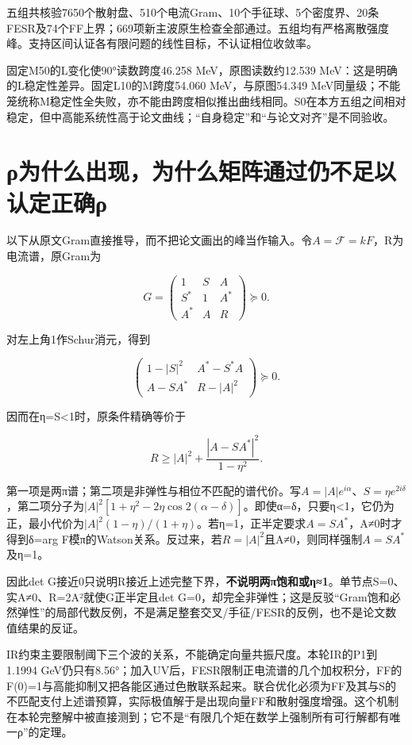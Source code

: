 \documentclass[
  10pt,
  a4paper,
]{article}
\begin{document}
五组共核验7650个散射盘、510个电流Gram、10个手征球、5个密度界、20条FESR及74个FF上界；669项新主波原生检查全部通过。五组均有严格离散强度峰。支持区间认证各有限问题的线性目标，不认证相位收敛率。

固定M50的L变化使90°读数跨度46.258 MeV，原图读数约12.539
MeV：这是明确的L稳定性差异。固定L10的M跨度54.060 MeV，与原图54.349
MeV同量级；不能笼统称M稳定性全失败，亦不能由跨度相似推出曲线相同。S0在本方五组之间相对稳定，但中高能系统性高于论文曲线；``自身稳定''和``与论文对齐''是不同验收。

\section{ρ为什么出现，为什么矩阵通过仍不足以认定正确ρ}\label{ux3c1ux4e3aux4ec0ux4e48ux51faux73b0ux4e3aux4ec0ux4e48ux77e9ux9635ux901aux8fc7ux4ecdux4e0dux8db3ux4ee5ux8ba4ux5b9aux6b63ux786eux3c1}

以下从原文Gram直接推导，而不把论文画出的峰当作输入。令\(A=\mathcal F=kF\)，R为电流谱，原Gram为

\[G=\begin{pmatrix}1&S&A\\S^*&1&A^*\\A^*&A&R\end{pmatrix}\succeq0.\]

对左上角1作Schur消元，得到

\[\begin{pmatrix}1-|S|^2&A^*-S^*A\\A-SA^*&R-|A|^2\end{pmatrix}\succeq0.\]

因而在η=\textbar S\textbar\textless1时，原条件精确等价于

\[R\ge |A|^2+\frac{|A-SA^*|^2}{1-\eta^2}.\]

第一项是两π谱；第二项是非弹性与相位不匹配的谱代价。写\(A=|A|e^{i\alpha}\)、\(S=\eta e^{2i\delta}\)，第二项分子为\(|A|^2[1+\eta^2-2\eta\cos 2(\alpha-\delta)]\)。即使α=δ，只要η\textless1，它仍为正，最小代价为\(|A|^2(1-\eta)/(1+\eta)\)。若η=1，正半定要求\(A=SA^*\)，A≠0时才得到δ=arg
F模π的Watson关系。反过来，若\(R=|A|^2\)且A≠0，则同样强制\(A=SA^*\)及η=1。

因此det
G接近0只说明R接近上述完整下界，\textbf{不说明两π饱和或η≈1}。单节点S=0、实A≠0、R=2A²就使G正半定且det
G=0，却完全非弹性；这是反驳``Gram饱和必然弹性''的局部代数反例，不是满足整套交叉/手征/FESR的反例，也不是论文数值结果的反证。

IR约束主要限制阈下三个波的关系，不能确定向量共振尺度。本轮IR的P1到1.1994
GeV仍只有8.56°；加入UV后，FESR限制正电流谱的几个加权积分，FF的F(0)=1与高能抑制又把各能区通过色散联系起来。联合优化必须为FF及其与S的不匹配支付上述谱预算，实际极值解于是出现向量FF和散射强度增强。这个机制在本轮完整解中被直接测到；它不是``有限几个矩在数学上强制所有可行解都有唯一ρ''的定理。
\end{document}

